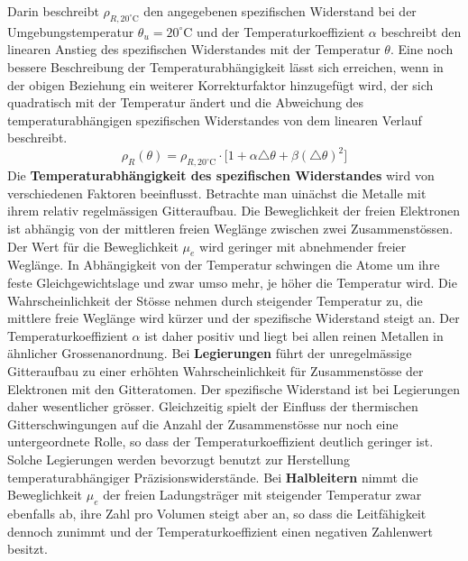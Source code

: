 Darin beschreibt $\rho_{R,20^{\circ}\text{C}}$ den angegebenen spezifischen Widerstand bei der Umgebungstemperatur $\theta_u=20^{\circ}\text{C}$ und der Temperaturkoeffizient $\alpha$ beschreibt den linearen Anstieg des spezifischen Widerstandes mit der Temperatur $\theta$.
\newline\newline
Eine noch bessere Beschreibung der Temperaturabhängigkeit lässt sich erreichen, wenn in der obigen Beziehung ein weiterer Korrekturfaktor hinzugefügt wird, der sich quadratisch mit der Temperatur ändert und die Abweichung des temperaturabhängigen spezifischen Widerstandes von dem linearen Verlauf beschreibt.
\begin{equation}
\boxed{\rho_R\left(\theta\right)=\rho_{R,20^{\circ}\text{C}}\cdot\Big[1+\alpha\triangle \theta+\beta\left(\triangle \theta\right)^2\Big]}
\end{equation}
Die \textbf{Temperaturabhängigkeit des spezifischen Widerstandes} wird von verschiedenen Faktoren beeinflusst. Betrachte man uinächst die Metalle mit ihrem relativ regelmässigen Gitteraufbau. Die Beweglichkeit der freien Elektronen ist abhängig von der mittleren freien Weglänge zwischen zwei Zusammenstössen. Der Wert für die Beweglichkeit $\mu_e$ wird geringer mit abnehmender freier Weglänge. In Abhängigkeit von der Temperatur schwingen die Atome um ihre feste Gleichgewichtslage und zwar umso mehr, je höher die Temperatur wird. 
\newline\newline
Die Wahrscheinlichkeit der Stösse nehmen durch steigender Temperatur zu, die mittlere freie Weglänge wird kürzer und der spezifische Widerstand steigt an. Der Temperaturkoeffizient $\alpha$ ist daher positiv und liegt bei allen reinen Metallen in ähnlicher Grossenanordnung.
\newline\newline
Bei \textbf{Legierungen} führt der unregelmässige Gitteraufbau zu einer erhöhten Wahrscheinlichkeit für Zusammenstösse der Elektronen mit den Gitteratomen. Der spezifische Widerstand ist bei Legierungen daher wesentlicher grösser. Gleichzeitig spielt der Einfluss der thermischen Gitterschwingungen auf die Anzahl der Zusammenstösse nur noch eine untergeordnete Rolle, so dass der Temperaturkoeffizient deutlich geringer ist. Solche Legierungen werden bevorzugt benutzt zur Herstellung temperaturabhängiger Präzisionswiderstände.
\newline\newline
Bei \textbf{Halbleitern} nimmt die Beweglichkeit $\mu_e$ der freien Ladungsträger mit steigender Temperatur zwar ebenfalls ab, ihre Zahl pro Volumen steigt aber an, so dass die Leitfähigkeit dennoch zunimmt und der Temperaturkoeffizient einen negativen Zahlenwert besitzt. 
